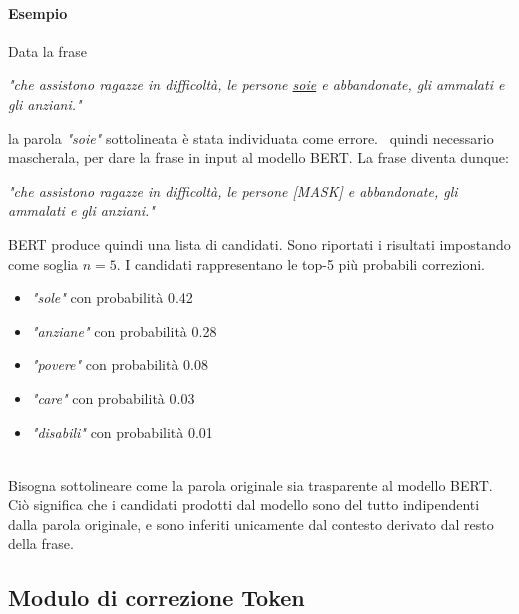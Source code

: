 \paragraph{Esempio} Data la frase 
\begin{center}
\textit{"che assistono ragazze in difficoltà, le persone \underline{soie} e abbandonate, gli ammalati e gli anziani."}
\end{center}
la parola \textit{"soie"} sottolineata è stata individuata come errore. \E\ quindi necessario mascherala, per dare la frase in input al modello BERT. La frase diventa dunque:
\begin{center}
\textit{"che assistono ragazze in difficoltà, le persone [MASK] e abbandonate, gli ammalati e gli anziani."}
\end{center}
BERT produce quindi una lista di candidati. Sono riportati i risultati impostando come soglia $n=5$. I candidati rappresentano le top-5 più probabili correzioni.
\begin{itemize}
\item \textit{"sole"} con probabilità 0.42
\item \textit{"anziane"} con probabilità 0.28
\item \textit{"povere"} con probabilità 0.08
\item \textit{"care"} con probabilità 0.03
\item \textit{"disabili"} con probabilità 0.01
\end{itemize}
\ \\
Bisogna sottolineare come la parola originale sia trasparente al modello BERT. Ciò significa che i candidati prodotti dal modello sono del tutto indipendenti dalla parola originale, e sono inferiti unicamente dal contesto derivato dal resto della frase.\\




\subsection{Modulo di correzione Token}
\label{sec:met_tok_correct}

